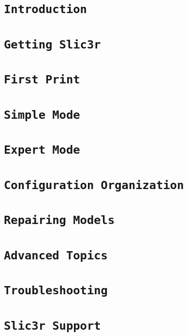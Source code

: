 %
%
%
%
%



\section{\texttt{Introduction}}


\section{\texttt{Getting Slic3r}}


\section{\texttt{First Print}}


\section{\texttt{Simple Mode}}


\section{\texttt{Expert Mode}}


\section{\texttt{Configuration Organization}}


\section{\texttt{Repairing Models}}


\section{\texttt{Advanced Topics}}


\section{\texttt{Troubleshooting}}


\section{\texttt{Slic3r Support}}

